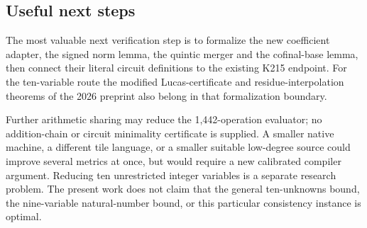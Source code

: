 \subsection{Useful next steps}

The most valuable next verification step is to formalize the new
coefficient adapter, the signed norm lemma, the quintic merger and the
cofinal-base lemma, then connect their literal circuit definitions to
the existing K215 endpoint.  For the ten-variable route the modified
Lucas-certificate and residue-interpolation theorems of the 2026 preprint
also belong in that formalization boundary.

Further arithmetic sharing may reduce the 1,442-operation evaluator; no
addition-chain or circuit minimality certificate is supplied.  A smaller
native machine, a different tile language, or a smaller suitable
low-degree source could improve several metrics at once, but would
require a new calibrated compiler argument.  Reducing ten unrestricted
integer variables is a separate research problem.  The present work
does not claim that the general ten-unknowns bound, the nine-variable
natural-number bound, or this particular consistency instance is optimal.
